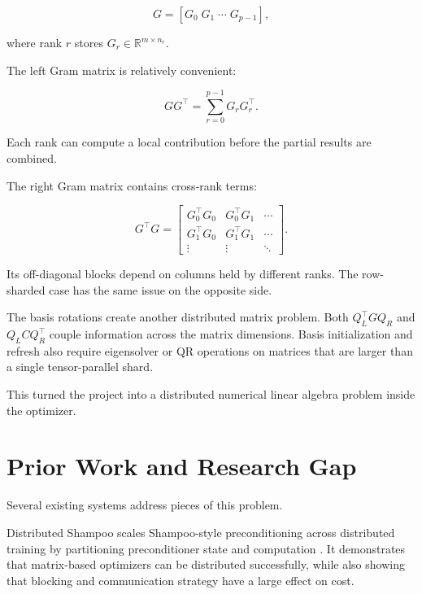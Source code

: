 \documentclass[11pt]{article}
\begin{document}
\begin{equation}
G = [G_0 \; G_1 \; \cdots \; G_{p-1}],
\end{equation}

where rank $r$ stores $G_r \in \mathbb{R}^{m \times n_r}$.

The left Gram matrix is relatively convenient:

\begin{equation}
GG^\top =
\sum_{r=0}^{p-1} G_rG_r^\top.
\end{equation}

Each rank can compute a local contribution before the partial results are combined.

The right Gram matrix contains cross-rank terms:

\begin{equation}
G^\top G =
\begin{bmatrix}
G_0^\top G_0 & G_0^\top G_1 & \cdots \\
G_1^\top G_0 & G_1^\top G_1 & \cdots \\
\vdots & \vdots & \ddots
\end{bmatrix}.
\end{equation}

Its off-diagonal blocks depend on columns held by different ranks. The row-sharded case has the same issue on the opposite side.

The basis rotations create another distributed matrix problem. Both
$Q_L^\top GQ_R$ and $Q_L C Q_R^\top$ couple information across the matrix dimensions. Basis initialization and refresh also require eigensolver or QR operations on matrices that are larger than a single tensor-parallel shard.

This turned the project into a distributed numerical linear algebra problem inside the optimizer.

\section{Prior Work and Research Gap}

Several existing systems address pieces of this problem.

Distributed Shampoo scales Shampoo-style preconditioning across distributed training by partitioning preconditioner state and computation \citep{shi2023distributedshampoo}. It demonstrates that matrix-based optimizers can be distributed successfully, while also showing that blocking and communication strategy have a large effect on cost.
\end{document}
